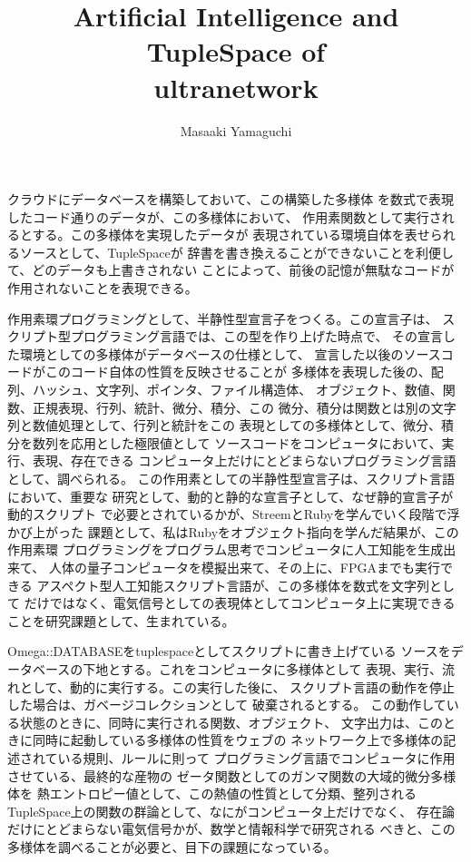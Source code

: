 \documentclass{jsarticle}
\begin{document}
\title{Artificial Intelligence and TupleSpace of \\
         ultranetwork}
\author{Masaaki Yamaguchi}
\date{}
\maketitle




  クラウドにデータベースを構築しておいて、この構築した多様体
  を数式で表現したコード通りのデータが、この多様体において、
  作用素関数として実行されるとする。この多様体を実現したデータが
  表現されている環境自体を表せられるソースとして、TupleSpaceが
  辞書を書き換えることができないことを利便して、どのデータも上書きされない
  ことによって、前後の記憶が無駄なコードが作用されないことを表現できる。

  作用素環プログラミングとして、半静性型宣言子をつくる。この宣言子は、
  スクリプト型プログラミング言語では、この型を作り上げた時点で、
  その宣言した環境としての多様体がデータベースの仕様として、
  宣言した以後のソースコードがこのコード自体の性質を反映させることが
  多様体を表現した後の、配列、ハッシュ、文字列、ポインタ、ファイル構造体、
  オブジェクト、数値、関数、正規表現、行列、統計、微分、積分、この
  微分、積分は関数とは別の文字列と数値処理として、行列と統計をこの
  表現としての多様体として、微分、積分を数列を応用とした極限値として
  ソースコードをコンピュータにおいて、実行、表現、存在できる
  コンピュータ上だけにとどまらないプログラミング言語として、調べられる。
  この作用素としての半静性型宣言子は、スクリプト言語において、重要な
  研究として、動的と静的な宣言子として、なぜ静的宣言子が動的スクリプト
  で必要とされているかが、StreemとRubyを学んでいく段階で浮かび上がった
  課題として、私はRubyをオブジェクト指向を学んだ結果が、この作用素環
  プログラミングをプログラム思考でコンピュータに人工知能を生成出来て、
  人体の量子コンピュータを模擬出来て、その上に、FPGAまでも実行できる
  アスペクト型人工知能スクリプト言語が、この多様体を数式を文字列として
  だけではなく、電気信号としての表現体としてコンピュータ上に実現できる
  ことを研究課題として、生まれている。


  Omega::DATABASEをtuplespaceとしてスクリプトに書き上げている
  ソースをデータベースの下地とする。これをコンピュータに多様体として
  表現、実行、流れとして、動的に実行する。この実行した後に、
  スクリプト言語の動作を停止した場合は、ガベージコレクションとして
  破棄されるとする。
  この動作している状態のときに、同時に実行される関数、オブジェクト、
  文字出力は、このときに同時に起動している多様体の性質をウェブの
  ネットワーク上で多様体の記述されている規則、ルールに則って
  プログラミング言語でコンピュータに作用させている、最終的な産物の
  ゼータ関数としてのガンマ関数の大域的微分多様体を
  熱エントロピー値として、この熱値の性質として分類、整列される
  TupleSpace上の関数の群論として、なにがコンピュータ上だけでなく、
  存在論だけにとどまらない電気信号かが、数学と情報科学で研究される
  べきと、この多様体を調べることが必要と、目下の課題になっている。
\end{document}
